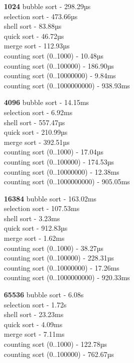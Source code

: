 \documentclass{article}
\begin{document}
\begin{normalsize}
\begin{multicols}{2}
		\begin{enumerate}
			\item [\textbf{1024}] bubble sort - 298.29µs\\
			selection sort - 473.66µs\\
			shell sort - 83.88µs\\
			quick sort - 46.72µs\\
			merge sort - 112.93µs\\
			counting sort (0..1000) - 10.48µs \\
			counting sort (0..100000) - 186.90µs\\
			counting sort (0..10000000) - 9.84ms \\
			counting sort (0..1000000000) - 938.93ms
			\item [\textbf{4096}] bubble sort - 14.15ms\\
			selection sort - 6.92ms\\
			shell sort - 557.47µs\\
			quick sort - 210.99µs\\
			merge sort - 392.51µs\\
			counting sort (0..1000) - 17.04µs\\
			counting sort (0..100000) - 174.53µs\\
			counting sort (0..10000000) - 12.38ms\\
			counting sort (0..1000000000) - 905.05ms
			\item [\textbf{16384}] bubble sort - 163.02ms\\
			selection sort - 107.53ms\\
			shell sort - 3.23ms\\
			quick sort - 912.83µs\\
			merge sort - 1.62ms\\
			counting sort (0..1000) - 38.27µs\\
			counting sort (0..100000) - 228.31µs\\
			counting sort (0..10000000) - 17.26ms\\
			counting sort (0..1000000000) - 920.33ms
			\item [\textbf{65536}] bubble sort - 6.08s\\
			selection sort - 1.72s\\
			shell sort - 23.23ms\\
			quick sort - 4.09ms\\
			merge sort - 7.11ms\\
			counting sort (0..1000) - 122.78µs\\
			counting sort (0..100000) - 762.67µs\\

\end{enumerate}
\end{multicols}
\end{normalsize}
\end{document}
